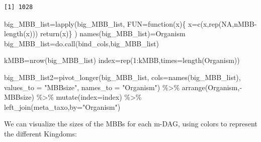 \documentclass[
  letterpaper,
  DIV=11,
  numbers=noendperiod]{scrreprt}
\newenvironment{Shaded}{}{}
\newcommand{\AttributeTok}[1]{\textcolor[rgb]{0.78,0.47,0.87}{#1}}
\newcommand{\ConstantTok}[1]{\textcolor[rgb]{0.82,0.60,0.40}{#1}}
\newcommand{\ControlFlowTok}[1]{\textcolor[rgb]{0.78,0.47,0.87}{#1}}
\newcommand{\DecValTok}[1]{\textcolor[rgb]{0.82,0.60,0.40}{#1}}
\newcommand{\FunctionTok}[1]{\textcolor[rgb]{0.38,0.69,0.94}{#1}}
\newcommand{\NormalTok}[1]{\textcolor[rgb]{0.67,0.70,0.75}{#1}}
\newcommand{\OtherTok}[1]{\textcolor[rgb]{0.15,0.68,0.38}{#1}}
\newcommand{\SpecialCharTok}[1]{\textcolor[rgb]{0.34,0.71,0.76}{#1}}
\newcommand{\StringTok}[1]{\textcolor[rgb]{0.60,0.76,0.47}{#1}}
\begin{document}
\begin{verbatim}
[1] 1028
\end{verbatim}

\begin{Shaded}
\begin{Highlighting}[]
\NormalTok{big\_MBB\_list}\OtherTok{=}\FunctionTok{lapply}\NormalTok{(big\_MBB\_list,}
                    \AttributeTok{FUN=}\ControlFlowTok{function}\NormalTok{(x)\{}
\NormalTok{                      x}\OtherTok{=}\FunctionTok{c}\NormalTok{(x,}\FunctionTok{rep}\NormalTok{(}\ConstantTok{NA}\NormalTok{,nMBB}\SpecialCharTok{{-}}\FunctionTok{length}\NormalTok{(x)))}
                      \FunctionTok{return}\NormalTok{(x)\}}
\NormalTok{)}
\FunctionTok{names}\NormalTok{(big\_MBB\_list)}\OtherTok{=}\NormalTok{Organism}
\NormalTok{big\_MBB\_list}\OtherTok{=}\FunctionTok{do.call}\NormalTok{(bind\_cols,big\_MBB\_list)}

\NormalTok{kMBB}\OtherTok{=}\FunctionTok{nrow}\NormalTok{(big\_MBB\_list)}
\NormalTok{index}\OtherTok{=}\FunctionTok{rep}\NormalTok{(}\DecValTok{1}\SpecialCharTok{:}\NormalTok{kMBB,}\AttributeTok{times=}\FunctionTok{length}\NormalTok{(Organism))}

\NormalTok{big\_MBB\_list2}\OtherTok{=}\FunctionTok{pivot\_longer}\NormalTok{(big\_MBB\_list,}
                           \AttributeTok{cols=}\FunctionTok{names}\NormalTok{(big\_MBB\_list),}
                           \AttributeTok{values\_to =} \StringTok{"MBBsize"}\NormalTok{,}
                           \AttributeTok{names\_to =} \StringTok{"Organism"}\NormalTok{) }\SpecialCharTok{\%\textgreater{}\%} 
  \FunctionTok{arrange}\NormalTok{(Organism,}\SpecialCharTok{{-}}\NormalTok{MBBsize) }\SpecialCharTok{\%\textgreater{}\%}  
  \FunctionTok{mutate}\NormalTok{(}\AttributeTok{index=}\NormalTok{index) }\SpecialCharTok{\%\textgreater{}\%} 
  \FunctionTok{left\_join}\NormalTok{(meta\_taxo,}\AttributeTok{by=}\StringTok{"Organism"}\NormalTok{)}
\end{Highlighting}
\end{Shaded}

We can visualize the sizes of the MBBs for each m-DAG, using colors to
represent the different Kingdoms:
\end{document}
